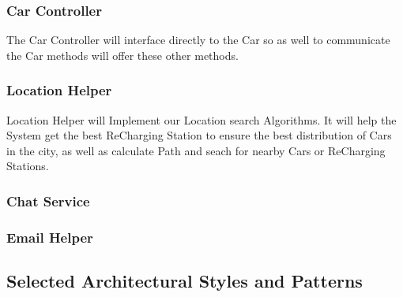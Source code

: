 \documentclass[a4paper]{article}
\begin{document}
\subsubsection{Car Controller}
The Car Controller will interface directly to the Car so as well to communicate the Car methods will offer these other methods.
\begin{figure}[h]
\centering
\vspace*{\fill}
\noindent{}%
\vspace*{0.25cm}
\end{figure}

\subsubsection{Location Helper}
Location Helper will Implement our Location search Algorithms. It will help the System get the best ReCharging Station to ensure the best distribution of Cars in the city, as well as calculate Path and seach for nearby Cars or ReCharging Stations.
\begin{figure}[h]
\centering
\vspace*{\fill}
\noindent{}%
\vspace*{0.25cm}
\end{figure}

\subsubsection{Chat Service}
\begin{figure}[h]
\centering
\vspace*{\fill}
\noindent{}
\vspace*{0.25cm}
\end{figure}

\subsubsection{Email Helper}
\begin{figure}[h]
\centering
\vspace*{\fill}
\noindent{}%
\vspace*{0.25cm}
\end{figure}

\subsection{Selected Architectural Styles and Patterns}
\end{document}
